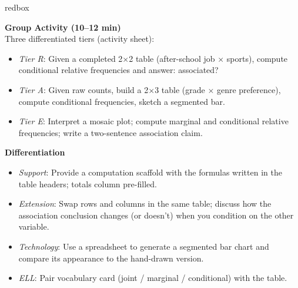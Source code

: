 \documentclass[10pt]{article}
\begin{document}
\begin{skillbox}{redbox}
\begin{minipage}[t]{0.48\linewidth}
    \textbf{Group Activity (10--12 min)}\\
    Three differentiated tiers (activity sheet):
    \begin{itemize}
        \item \textit{Tier R}: Given a completed 2$\times$2 table (after-school job $\times$
              sports), compute conditional relative frequencies and answer: associated?
        \item \textit{Tier A}: Given raw counts, build a 2$\times$3 table (grade $\times$
              genre preference), compute conditional frequencies, sketch a segmented bar.
        \item \textit{Tier E}: Interpret a mosaic plot; compute marginal and conditional
              relative frequencies; write a two-sentence association claim.
    \end{itemize}
\end{minipage}
\hfill
\begin{minipage}[t]{0.48\linewidth}
    \textbf{Differentiation}
    \begin{itemize}
        \item \textit{Support}: Provide a computation scaffold with the formulas written
              in the table headers; totals column pre-filled.
        \item \textit{Extension}: Swap rows and columns in the same table; discuss how the
              association conclusion changes (or doesn't) when you condition on the other variable.
        \item \textit{Technology}: Use a spreadsheet to generate a segmented bar chart and
              compare its appearance to the hand-drawn version.
        \item \textit{ELL}: Pair vocabulary card (joint / marginal / conditional) with the table.
    \end{itemize}
\end{minipage}
\end{skillbox}
\end{document}
